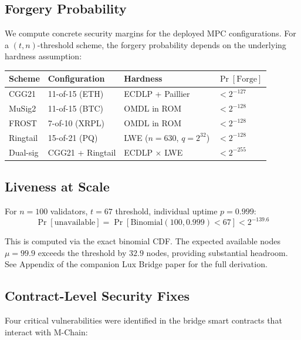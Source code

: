 \documentclass[11pt]{article}
\begin{document}
\subsection{Forgery Probability}

We compute concrete security margins for the deployed MPC configurations. For a $(t, n)$-threshold scheme, the forgery probability depends on the underlying hardness assumption:

\begin{table}[h]
\centering
\begin{tabular}{@{}llll@{}}
\toprule
\textbf{Scheme} & \textbf{Configuration} & \textbf{Hardness} & \textbf{$\Pr[\text{Forge}]$} \\
\midrule
CGG21 & 11-of-15 (ETH) & ECDLP + Paillier & $< 2^{-127}$ \\
MuSig2 & 11-of-15 (BTC) & OMDL in ROM & $< 2^{-128}$ \\
FROST & 7-of-10 (XRPL) & OMDL in ROM & $< 2^{-128}$ \\
Ringtail & 15-of-21 (PQ) & LWE ($n=630$, $q=2^{32}$) & $< 2^{-128}$ \\
Dual-sig & CGG21 + Ringtail & ECDLP $\times$ LWE & $< 2^{-255}$ \\
\bottomrule
\end{tabular}

\label{tab:concrete-security}
\end{table}

\subsection{Liveness at Scale}

For $n = 100$ validators, $t = 67$ threshold, individual uptime $p = 0.999$:
\begin{equation}
\Pr[\text{unavailable}] = \Pr[\text{Binomial}(100, 0.999) < 67] < 2^{-139.6}
\end{equation}

This is computed via the exact binomial CDF. The expected available nodes $\mu = 99.9$ exceeds the threshold by $32.9$ nodes, providing substantial headroom. See Appendix of the companion Lux Bridge paper \cite{lux-bridge-2025} for the full derivation.

\subsection{Contract-Level Security Fixes}

Four critical vulnerabilities were identified in the bridge smart contracts that interact with M-Chain:
\end{document}
